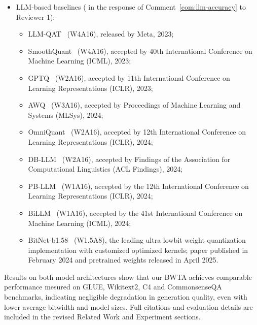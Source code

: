 \begin{revresponse}[]
\begin{itemize}
    \item LLM-based baselines ( in the response of Comment~\ref{com:llm-accuracy} to Reviewer 1):
    \begin{itemize}
        \item LLM-QAT~\cite{llm-qat} (W4A16), released by Meta, 2023; 
        \item SmoothQuant~\cite{xiao2023smoothquant} (W4A16), accepted by 40th International Conference on Machine Learning (ICML), 2023; 
        \item GPTQ~\cite{gptq} (W2A16), accepted by 11th International Conference on Learning Representations (ICLR), 2023; 
        \item AWQ~\cite{lin2024awq} (W3A16), accepted by Proceedings of Machine Learning and Systems (MLSys), 2024; 
        \item OmniQuant~\cite{shao2023omniquant} (W2A16),  accepted by  12th International Conference on Learning Representations (ICLR), 2024; 
        \item DB-LLM~\cite{chen2024dbllm} (W2A16), accepted by Findings of the Association for Computational Linguistics (ACL Findings), 2024; 
        \item PB-LLM~\cite{shang2023pbllm} (W1A16), accepted by the 12th International Conference on Learning Representations (ICLR), 2024; 
        \item BiLLM~\cite{huang2024billm} (W1A16), accepted by the 41st International Conference on Machine Learning (ICML), 2024; 
        \item BitNet-b1.58~\cite{wang2023bitnet} (W1.5A8), the leading ultra lowbit weight quantization implementation with customized optimized kernels; paper published in February 2024 and pretrained weights released in April 2025. 
    \end{itemize}
\end{itemize}

Results on both model architectures show that our BWTA achieves comparable performance mesured on GLUE, Wikitext2, C4 and CommonsenseQA benchmarks, indicating negligible degradation in generation quality, even with lower average bitwidth and model sizes. Full citations and evaluation details are included in the revised Related Work and Experiment sections. 

\end{revresponse}

